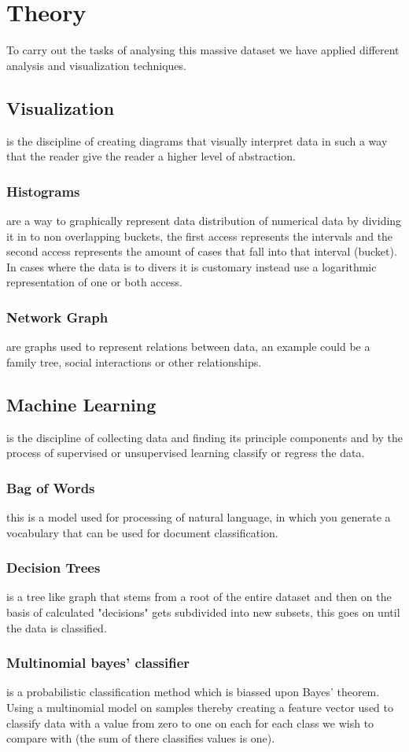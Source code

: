 \section{Theory}
To carry out the tasks of analysing this massive dataset we have applied different analysis and visualization techniques.
\subsection{Visualization}
is the discipline of creating diagrams that visually interpret data in such a way that the reader give the reader a higher level of abstraction.
\subsubsection{Histograms}
are a way to graphically represent data distribution of numerical data by dividing it in to non overlapping buckets, the first access represents the intervals and the second access represents the amount of cases that fall into that interval (bucket). In cases where the data is to divers it is customary instead use a logarithmic representation of one or both access.
\subsubsection{Network Graph}
are graphs used to represent relations between data, an example could be a family tree, social interactions or other relationships.
\subsection{Machine Learning}
is the discipline of collecting data and finding its principle components and by the process of supervised or unsupervised learning classify or regress the data.
\subsubsection{Bag of Words}
this is a model used for processing of natural language, in which you generate a vocabulary that can be used for document classification. 
\subsubsection{Decision Trees}
is a tree like graph that stems from a root of the entire dataset and then on the basis of calculated "decisions" gets subdivided into new subsets, this goes on until the data is classified.
\subsubsection{Multinomial bayes' classifier} is a probabilistic classification method which is biassed upon Bayes' theorem. Using a multinomial model on samples thereby creating a feature vector used to classify data with a value from zero to one on each for each class we wish to compare with (the sum of there classifies values is one).